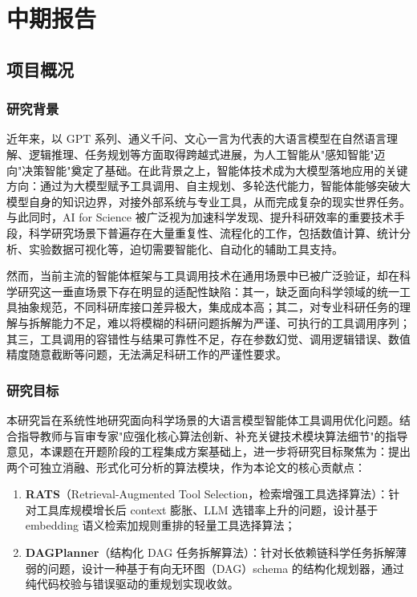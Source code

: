 \cleardoublepage
\chapter{中期报告}

\section{项目概况}

\subsection{研究背景}

近年来，以 GPT 系列、通义千问、文心一言为代表的大语言模型在自然语言理解、逻辑推理、任务规划等方面取得跨越式进展，为人工智能从"感知智能"迈向"决策智能"奠定了基础。在此背景之上，智能体技术成为大模型落地应用的关键方向：通过为大模型赋予工具调用、自主规划、多轮迭代能力，智能体能够突破大模型自身的知识边界，对接外部系统与专业工具，从而完成复杂的现实世界任务。与此同时，AI for Science 被广泛视为加速科学发现、提升科研效率的重要技术手段，科学研究场景下普遍存在大量重复性、流程化的工作，包括数值计算、统计分析、实验数据可视化等，迫切需要智能化、自动化的辅助工具支持。

然而，当前主流的智能体框架与工具调用技术在通用场景中已被广泛验证，却在科学研究这一垂直场景下存在明显的适配性缺陷：其一，缺乏面向科学领域的统一工具抽象规范，不同科研库接口差异极大，集成成本高；其二，对专业科研任务的理解与拆解能力不足，难以将模糊的科研问题拆解为严谨、可执行的工具调用序列；其三，工具调用的容错性与结果可靠性不足，存在参数幻觉、调用逻辑错误、数值精度随意截断等问题，无法满足科研工作的严谨性要求。

\subsection{研究目标}

本研究旨在系统性地研究面向科学场景的大语言模型智能体工具调用优化问题。结合指导教师与盲审专家"应强化核心算法创新、补充关键技术模块算法细节"的指导意见，本课题在开题阶段的工程集成方案基础上，进一步将研究目标聚焦为：提出两个可独立消融、形式化可分析的算法模块，作为本论文的核心贡献点：

\begin{enumerate}
    \item \textbf{RATS}（Retrieval-Augmented Tool Selection，检索增强工具选择算法）：针对工具库规模增长后 context 膨胀、LLM 选错率上升的问题，设计基于 embedding 语义检索加规则重排的轻量工具选择算法；
    \item \textbf{DAGPlanner}（结构化 DAG 任务拆解算法）：针对长依赖链科学任务拆解薄弱的问题，设计一种基于有向无环图（DAG）schema 的结构化规划器，通过纯代码校验与错误驱动的重规划实现收敛。
\end{enumerate}

